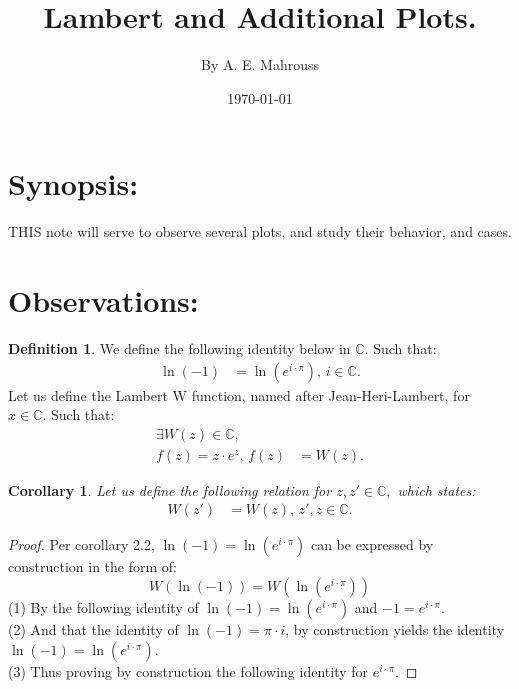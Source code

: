 \documentclass[10pt]{article}
\title{%
	\vspace{-1.5em}%
	\large\textbf{Lambert and Additional Plots.}%
}
\author{By A. E. Mahrouss}
\date{\today}
\theoremstyle{plain}
\newtheorem{corollary}[theorem]{Corollary}
\theoremstyle{definition}
\newtheorem{definition}[theorem]{Definition}
\theoremstyle{remark}
\begin{document}

\maketitle
\tableofcontents
\newpage

\section{Synopsis:}

\lettrine[lines=1, lhang=0.1, loversize=0.2]{T}HIS note will serve to observe several plots, and study their behavior, and cases.

\section{Observations:}

\begin{definition}
	We define the following identity below in $\mathbb{C}.$ Such that:
	\begin{align*}
		\ln(-1)&=\ln(e^{i \cdot \pi}), \, i \in \mathbb{C}.
	\end{align*}
	Let us define the Lambert W function, named after Jean-Heri-Lambert, for $x \in \mathbb{C}.$ Such that:
	\begin{align*}
		\exists W(z) \in \mathbb{C},\\
		f(z) = z \cdot e^{z}, \, f(z) &= W(z).
	\end{align*}
\end{definition}

\begin{corollary}
	Let us define the following relation for $z, z' \in \mathbb{C},$ which states:
	\begin{align*}
		W(z') &= W(z), \, z', z \in \mathbb{C}.
	\end{align*}
\end{corollary}

\begin{proof}
	Per corollary 2.2, $\ln(-1)=\ln(e^{i \cdot \pi})$ can be expressed by construction in the form of:
	\begin{equation}
		W(\ln(-1)) = W(\ln(e^{i \cdot \pi}))
	\end{equation}
	(1) By the following identity of $\ln(-1)=\ln(e^{i \cdot \pi})$ and $-1 = e^{i \cdot \pi}.$\\
	(2) And that the identity of $\ln(-1) = \pi \cdot i$, by construction yields the identity $\ln(-1) = \ln(e^{i \cdot \pi}).$\\
	(3) Thus proving by construction the following identity for $e^{i \cdot \pi}$.
\end{proof}
\end{document}
